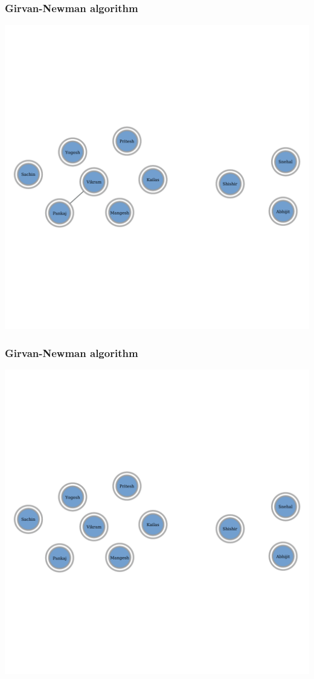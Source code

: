 \documentclass{beamer}
\begin{document}
\begin{frame}
    \frametitle{Girvan-Newman algorithm}
    \centering
    \includegraphics[width=0.8\columnwidth]{gn16.pdf}
\end{frame}
\begin{frame}
    \frametitle{Girvan-Newman algorithm}
    \centering
    \includegraphics[width=0.8\columnwidth]{gn17.pdf}
\end{frame}
\end{document}
